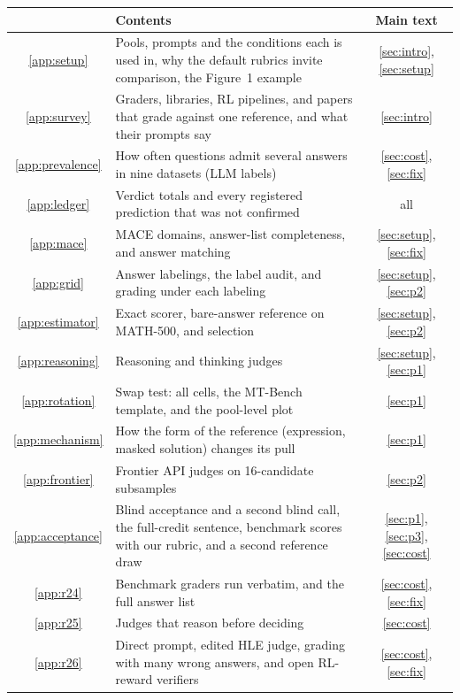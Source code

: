 \begin{center}
\footnotesize
\setlength{\tabcolsep}{4pt}
\renewcommand{\arraystretch}{1.08}
\begin{tabular}{cL{10.6cm}c}
\toprule
& Contents & Main text \\
\midrule
\ref{app:setup} & Pools, prompts and the conditions each is used in, why the default rubrics invite comparison, the Figure~1 example & \ref{sec:intro}, \ref{sec:setup} \\
\ref{app:survey} & Graders, libraries, RL pipelines, and papers that grade against one reference, and what their prompts say & \ref{sec:intro} \\
\ref{app:prevalence} & How often questions admit several answers in nine datasets (LLM labels) & \ref{sec:cost}, \ref{sec:fix} \\
\ref{app:ledger} & Verdict totals and every registered prediction that was not confirmed & all \\
\ref{app:mace} & \textsc{MACE} domains, answer-list completeness, and answer matching & \ref{sec:setup}, \ref{sec:fix} \\
\ref{app:grid} & Answer labelings, the label audit, and grading under each labeling & \ref{sec:setup}, \ref{sec:p2} \\
\ref{app:estimator} & Exact scorer, bare-answer reference on MATH-500, and selection & \ref{sec:setup}, \ref{sec:p2} \\
\ref{app:reasoning} & Reasoning and thinking judges & \ref{sec:setup}, \ref{sec:p1} \\
\ref{app:rotation} & Swap test: all cells, the MT-Bench template, and the pool-level plot & \ref{sec:p1} \\
\ref{app:mechanism} & How the form of the reference (expression, masked solution) changes its pull & \ref{sec:p1} \\
\ref{app:frontier} & Frontier API judges on 16-candidate subsamples & \ref{sec:p2} \\
\ref{app:acceptance} & Blind acceptance and a second blind call, the full-credit sentence, benchmark scores with our rubric, and a second reference draw & \ref{sec:p1}, \ref{sec:p3}, \ref{sec:cost} \\
\ref{app:r24} & Benchmark graders run verbatim, and the full answer list & \ref{sec:cost}, \ref{sec:fix} \\
\ref{app:r25} & Judges that reason before deciding & \ref{sec:cost} \\
\ref{app:r26} & Direct prompt, edited HLE judge, grading with many wrong answers, and open RL-reward verifiers & \ref{sec:cost}, \ref{sec:fix} \\

\end{tabular}
\end{center}
